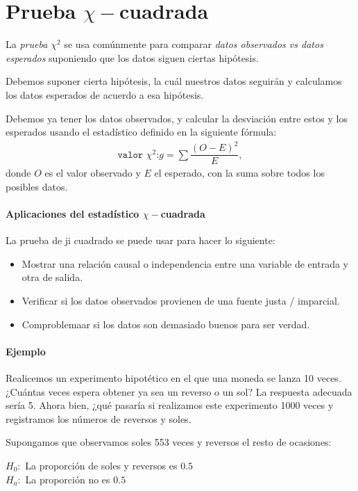 \section{Prueba $\chi-$cuadrada}

La \emph{prueba $\chi^{2}$} se usa comúnmente para comparar \emph{datos observados vs datos esperados} suponiendo que los datos siguen ciertas hipótesis.


Debemos suponer cierta hipótesis, la cuál nuestros datos seguirán y calculamos los datos esperados de acuerdo a esa hipótesis.


Debemos ya tener los datos observados, y calcular la desviación entre estos y los esperados usando el estadístico definido en la siguiente fórmula:
\begin{align}
	\texttt{valor }\chi^{2}\texttt{:} g= \sum\dfrac{\left( O-E \right)^{2}}{E},
\end{align}
donde $O$ es el valor observado y $E$ el esperado, con la suma sobre todos los posibles datos.

\paragraph{Aplicaciones del estadístico $\chi-$cuadrada}
La prueba de ji cuadrado se puede usar para hacer lo siguiente:
\begin{itemize}
	\item Mostrar una relación causal o independencia entre una variable de entrada y otra de salida.  
	\item Verificar si los datos observados provienen de una fuente justa / imparcial. 
	\item Comproblemaar si los datos son demasiado buenos para ser verdad.
\end{itemize}


\paragraph{Ejemplo}
Realicemos un experimento hipotético en el que una moneda se lanza 10 veces. ¿Cuántas veces espera obtener ya sea un reverso o un sol?  La respuesta adecuada sería 5.  Ahora bien, ¿qué pasaría si realizamos este experimento 1000 veces y registramos los números de reversos y soles.


Supongamos que observamos soles 553 veces y reversos el resto de ocasiones:
\begin{center}
	$H_{0}:$ La proporción de soles y reversos es $0.5$ \\
	$H_{a}:$ La proporción no es $0.5$
\end{center}



